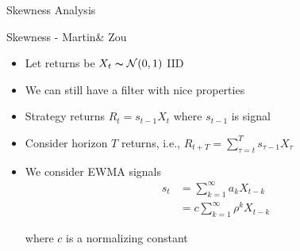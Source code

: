 \begin{frame}{Skewness Analysis}

\begin{alertblock}{Skewness - Martin\& Zou}
    \begin{itemize}
        \item  Let returns be  $X_t\thicksim \mathcal{ N}(0,1)$ IID
        \item We can still have a filter with nice properties
       \item Strategy returns $R_t = s_{t-1}X_t$ where $s_{t-1}$ is signal
       \item Consider horizon $T$ returns, i.e., $R_{t+T}=\sum_{\tau=t}^T s_{\tau-1}X_\tau$
       \item We consider EWMA signals 
       \begin{align*}
       s_{t}&=\sum_{k=1}^\infty a_k X_{t-k}\\
       &=c\sum_{k=1}^\infty\rho^k X_{t-k}
        \end{align*}

        where $c$ is a normalizing constant
    \end{itemize}

\end{alertblock}
\end{frame}

